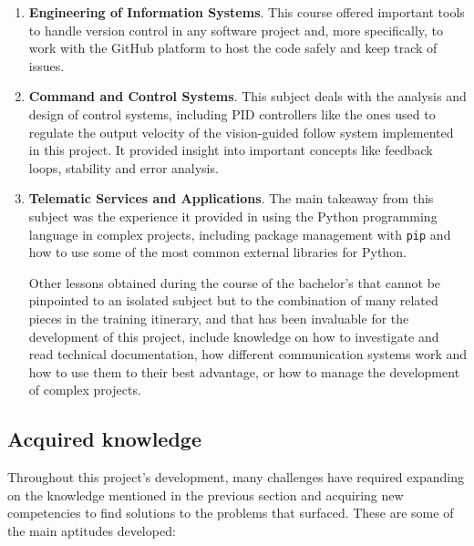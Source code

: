 \begin{enumerate}
    \item \textbf{Engineering of Information Systems}. This course offered important tools to handle version control in any software project and, more specifically, to work with the GitHub platform to host the code safely and keep track of issues.
    
    \item \textbf{Command and Control Systems}. This subject deals with the analysis and design of control systems, including PID controllers like the ones used to regulate the output velocity of the vision-guided follow system implemented in this project. It provided insight into important concepts like feedback loops, stability and error analysis.
    
    \item \textbf{Telematic Services and Applications}. The main takeaway from this subject was the experience it provided in using the Python programming language in complex projects, including package management with \texttt{pip} and how to use some of the most common external libraries for Python.
    
    Other lessons obtained during the course of the bachelor's that cannot be pinpointed to an isolated subject but to the combination of many related pieces in the training itinerary, and that has been invaluable for the development of this project, include knowledge on how to investigate and read technical documentation, how different communication systems work and how to use them to their best advantage, or how to manage the development of complex projects.
\end{enumerate}


\subsection{Acquired knowledge}

Throughout this project's development, many challenges have required expanding on the knowledge mentioned in the previous section and acquiring new competencies to find solutions to the problems that surfaced.
These are some of the main aptitudes developed:


